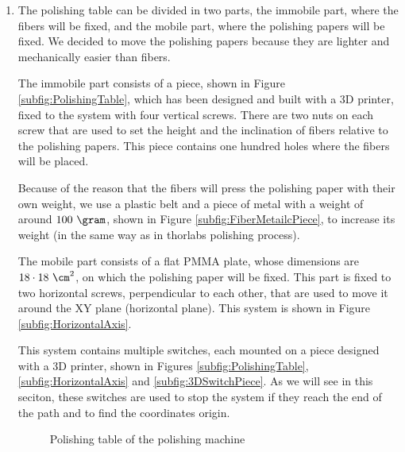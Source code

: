\begin{enumerate}
\item{} The polishing table can be divided in two parts, the immobile part, where the fibers will be fixed, and the mobile part, where the polishing papers will be fixed. We decided to move the polishing papers because they are lighter and mechanically easier than fibers.

The immobile part consists of a piece, shown in Figure \ref{subfig:PolishingTable}, which has been designed and built with a 3D printer, fixed to the system with four vertical screws. There are two nuts on each screw that are used to set the height and the inclination of fibers relative to the polishing papers. This piece contains one hundred holes where the fibers will be placed. 

Because of the reason that the fibers will press the polishing paper with their own weight, we use a plastic belt and a piece of metal with a weight of around $100~\gram$, shown in Figure \ref{subfig:FiberMetailcPiece}, to increase its weight (in the same way as in thorlabs polishing process).

The mobile part consists of a flat PMMA plate, whose dimensions are $18 \cdot{} 18~\cm^2$, on which the polishing paper will be fixed. This part is fixed to two horizontal screws, perpendicular to each other, that are used to move it around the XY plane (horizontal plane). This system is shown in Figure \ref{subfig:HorizontalAxis}.

This system contains multiple switches, each mounted on a piece designed with a 3D printer, shown in Figures \ref{subfig:PolishingTable}, \ref{subfig:HorizontalAxis} and \ref{subfig:3DSwitchPiece}. As we will see in this seciton, these switches are used to stop the system if they reach the end of the path and to find the coordinates origin.

\begin{figure}[htbp]
 \centering
    \newline
 \caption{Polishing table of the polishing machine}
 \label{fig:PolishingTable}
\end{figure}


\end{enumerate}
